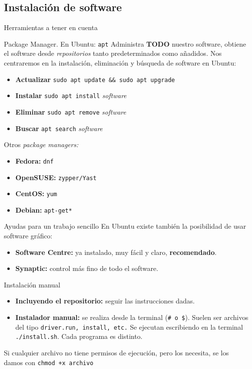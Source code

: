 \documentclass[12pt]{beamer}
\begin{document}
\subsection{Instalación de software}
\begin{frame}[allowframebreaks]{Herramientas a tener en cuenta}
	\begin{block}{Package Manager. En Ubuntu: \texttt{apt}}
		Administra \textbf{TODO} nuestro software, obtiene el software desde \textit{repositorios} tanto predeterminados como añadidos. Nos centraremos en la instalación, eliminación y búsqueda de software en Ubuntu:
		\begin{itemize}
			\item \textbf{Actualizar} \texttt{sudo apt update \&\& sudo apt upgrade}
			\item \textbf{Instalar} \texttt{sudo apt install} \textit{software}
			\item \textbf{Eliminar} \texttt{sudo apt remove} \textit{software}
			\item \textbf{Buscar} \texttt{apt search} \textit{software}
		\end{itemize}
	\end{block}
	Otros \textit{package managers:}
	\begin{itemize}
		\item \textbf{Fedora:} \texttt{dnf}
		\item \textbf{OpenSUSE:} \texttt{zypper/Yast}
		\item \textbf{CentOS:} \texttt{yum}
		\item \textbf{Debian:} \texttt{apt-get*}
	\end{itemize}
	\begin{block}{Ayudas para un trabajo sencillo}
		En Ubuntu existe también la posibilidad de usar software gráfico:
		\begin{itemize}
			\item \textbf{Software Centre:} ya instalado, muy fácil y claro, \textbf{recomendado}.
			\item \textbf{Synaptic:} control más fino de todo el software.
		\end{itemize}
	\end{block}
	\begin{block}{Instalación manual}
		\begin{itemize}
			\item \textbf{Incluyendo el repositorio:} seguir las instrucciones dadas.
			\item \textbf{Instalador manual:} se realiza desde la terminal (\texttt{\# o \$}). Suelen ser archivos del tipo \texttt{driver.run, install, etc.} Se ejecutan escribiendo en la terminal \texttt{./install.sh}. Cada programa es distinto.
		\end{itemize}
	\end{block}
	Si cualquier archivo no tiene permisos de ejecución, pero los necesita, se los damos con  \texttt{chmod +x archivo}
\end{frame}
\end{document}
